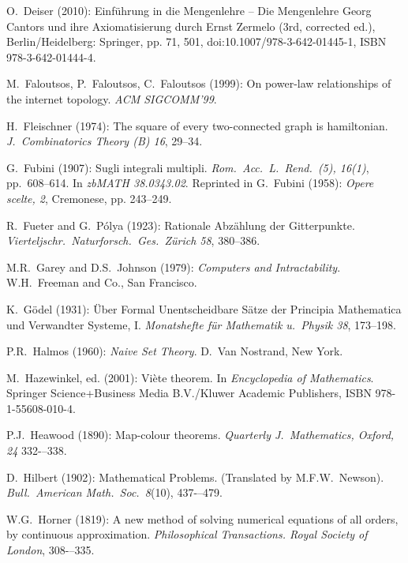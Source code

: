 \begin{thebibliography}{999}
O.~Deiser (2010): Einf\"{u}hrung in die Mengenlehre – Die Mengenlehre
Georg Cantors und ihre Axiomatisierung durch Ernst Zermelo (3rd,
corrected ed.), Berlin/Heidelberg: Springer, pp. 71, 501,
doi:10.1007/978-3-642-01445-1, ISBN 978-3-642-01444-4.




M.~Faloutsos, P.~Faloutsos, C.~Faloutsos (1999):
On power-law relationships of the internet topology.  {\it ACM
  SIGCOMM'99}.

H.~Fleischner (1974):
The square of every two-connected graph is hamiltonian.
{\it J.~Combinatorics Theory (B) 16}, 29--34.

G.~Fubini (1907): Sugli integrali multipli.
{\it Rom.~Acc.~L.~Rend.~(5), 16(1)}, pp.~608–614.  In {\it zbMATH
  38.0343.02}.  Reprinted in
G.~Fubini (1958): {\it Opere scelte, 2}, Cremonese, pp. 243–249.

R.~Fueter and G.~P\'{o}lya (1923):
Rationale Abz\"{a}hlung der Gitterpunkte.  {\it
Vierteljschr.~Naturforsch.~Ges.~Z\"{u}rich 58}, 380--386.


M.R.~Garey and D.S.~Johnson (1979):
{\it Computers and Intractability}.
W.H.~Freeman and Co., San Francisco.

K.~G\"{o}del (1931): \"{U}ber Formal Unentscheidbare S\"{a}tze der
Principia Mathematica und Verwandter Systeme, I.  {\it Monatshefte
f\"{u}r Mathematik u.~Physik 38}, 173--198.



P.R.~Halmos (1960):
{\it Naive Set Theory}.
D.~Van Nostrand, New York.

M.~Hazewinkel, ed. (2001): %
Vi\`{e}te theorem.  In {\it Encyclopedia of Mathematics}.
Springer Science+Business Media B.V./Kluwer Academic Publishers,
ISBN 978-1-55608-010-4.

P.J.~Heawood (1890):
Map-colour theorems.  {\it Quarterly J.~Mathematics, Oxford, 24}
332-–338.

D.~Hilbert (1902): Mathematical Problems.  (Translated by
M.F.W.~Newson).  {\it Bull.~American Math.~Soc.~8}(10), 437-–479.

W.G.~Horner (1819): 
A new method of solving numerical equations of all orders, by
continuous approximation. {\it Philosophical Transactions. Royal
Society of London}, 308-–335.


\end{thebibliography}
